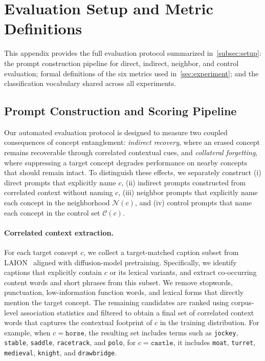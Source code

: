 \section{Evaluation Setup and Metric Definitions}
\label{app:evaluation_setup}
This appendix provides the full evaluation protocol summarized in~\cref{subsec:setup}: the prompt construction pipeline for direct, indirect, neighbor, and control evaluation; formal definitions of the six metrics used in~\cref{sec:experiment}; and the classification vocabulary shared across all experiments.

\subsection{Prompt Construction and Scoring Pipeline}
\label{app:eval_pipeline}
Our automated evaluation protocol is designed to measure two coupled consequences of concept entanglement: \emph{indirect recovery}, where an erased concept remains recoverable through correlated contextual cues, and \emph{collateral forgetting}, where suppressing a target concept degrades performance on nearby concepts that should remain intact. To distinguish these effects, we separately construct (i) direct prompts that explicitly name $c$, (ii) indirect prompts constructed from correlated context without naming $c$, (iii) neighbor prompts that explicitly name each concept in the neighborhood $\mathcal{N}(c)$, and (iv) control prompts that name each concept in the control set $\mathcal{C}(c)$.

\paragraph{Correlated context extraction.}
For each target concept $c$, we collect a target-matched caption subset from LAION~\citep{schuhmann2022laion} aligned with diffusion-model pretraining. Specifically, we identify captions that explicitly contain $c$ or its lexical variants, and extract co-occurring content words and short phrases from this subset. We remove stopwords, punctuation, low-information function words, and lexical forms that directly mention the target concept. The remaining candidates are ranked using corpus-level association statistics and filtered to obtain a final set of correlated context words that captures the contextual footprint of $c$ in the training distribution. For example, when $c=\texttt{horse}$, the resulting set includes terms such as \texttt{jockey}, \texttt{stable}, \texttt{saddle}, \texttt{racetrack}, and \texttt{polo}, for $c = \texttt{castle}$, it includes \texttt{moat}, \texttt{turret}, \texttt{medieval}, \texttt{knight}, and \texttt{drawbridge}.

